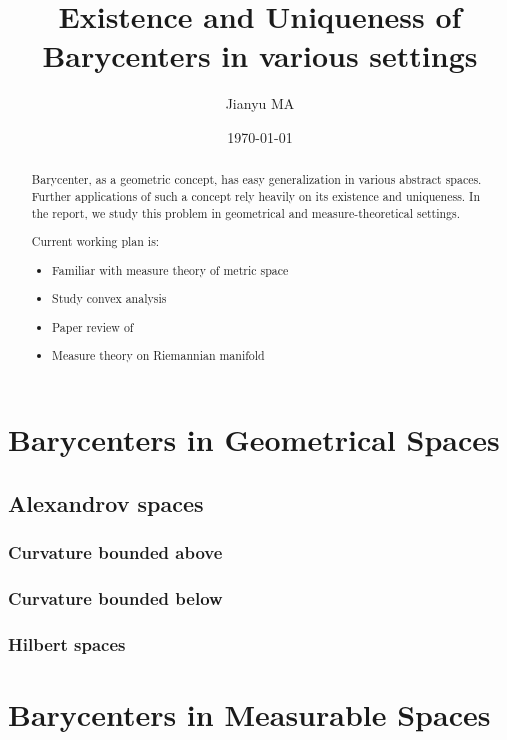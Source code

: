 \documentclass{report}
\title{Existence and Uniqueness of Barycenters in various settings}
\author{Jianyu MA}
\date{\today}
\theoremstyle{remark}
\theoremstyle{definition}
\begin{document}
\maketitle

\begin{abstract}
	Barycenter, as a geometric concept, has easy generalization in various abstract spaces. Further applications of such a concept rely heavily on its existence and uniqueness. In the report, we study this problem in geometrical and measure-theoretical settings.

	Current working plan is:
	\begin{itemize}
		\item Familiar with measure theory of metric space
		\item Study convex analysis
		\item Paper review of \cite{KIM2017640}
		\item Measure theory on Riemannian manifold
	\end{itemize}
\end{abstract}

\tableofcontents
{}


\part{Barycenters in Geometrical Spaces}



\chapter{Alexandrov spaces}
\section{Curvature bounded above}
\section{Curvature bounded below}
\section{Hilbert spaces}


\part{Barycenters in Measurable Spaces}





\printbibliography
\end{document}
